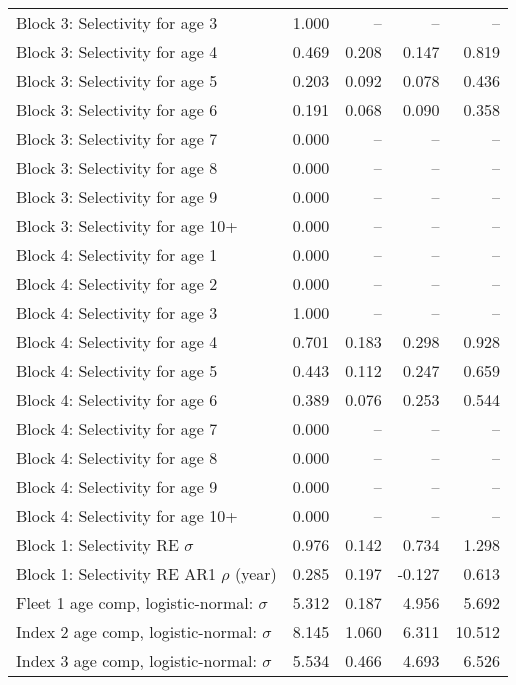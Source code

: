 \documentclass[
]{article}
\begin{document}
\begin{landscape}
\begin{longtable}[t]{lrrrr}
\addlinespace
Block 3: Selectivity for age 3 & 1.000 & -- & -- & --\\
Block 3: Selectivity for age 4 & 0.469 & 0.208 & 0.147 & 0.819\\
Block 3: Selectivity for age 5 & 0.203 & 0.092 & 0.078 & 0.436\\
Block 3: Selectivity for age 6 & 0.191 & 0.068 & 0.090 & 0.358\\
Block 3: Selectivity for age 7 & 0.000 & -- & -- & --\\
\addlinespace
Block 3: Selectivity for age 8 & 0.000 & -- & -- & --\\
Block 3: Selectivity for age 9 & 0.000 & -- & -- & --\\
Block 3: Selectivity for age 10+ & 0.000 & -- & -- & --\\
Block 4: Selectivity for age 1 & 0.000 & -- & -- & --\\
Block 4: Selectivity for age 2 & 0.000 & -- & -- & --\\
\addlinespace
Block 4: Selectivity for age 3 & 1.000 & -- & -- & --\\
Block 4: Selectivity for age 4 & 0.701 & 0.183 & 0.298 & 0.928\\
Block 4: Selectivity for age 5 & 0.443 & 0.112 & 0.247 & 0.659\\
Block 4: Selectivity for age 6 & 0.389 & 0.076 & 0.253 & 0.544\\
Block 4: Selectivity for age 7 & 0.000 & -- & -- & --\\
\addlinespace
Block 4: Selectivity for age 8 & 0.000 & -- & -- & --\\
Block 4: Selectivity for age 9 & 0.000 & -- & -- & --\\
Block 4: Selectivity for age 10+ & 0.000 & -- & -- & --\\
Block 1: Selectivity RE $\sigma$ & 0.976 & 0.142 & 0.734 & 1.298\\
Block 1: Selectivity RE AR1 $\rho$ (year) & 0.285 & 0.197 & -0.127 & 0.613\\
\addlinespace
Fleet 1 age comp, logistic-normal: $\sigma$ & 5.312 & 0.187 & 4.956 & 5.692\\
Index 2 age comp, logistic-normal: $\sigma$ & 8.145 & 1.060 & 6.311 & 10.512\\
Index 3 age comp, logistic-normal: $\sigma$ & 5.534 & 0.466 & 4.693 & 6.526\\*
\end{longtable}
\end{landscape}
\end{document}

